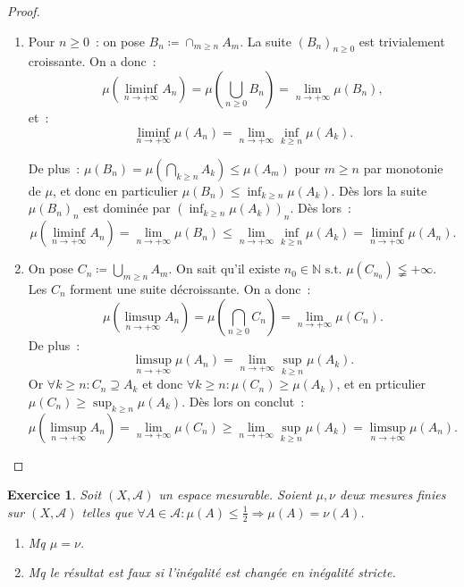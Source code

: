 \documentclass{article}
\newtheorem{ex}{Exercice}[section]
\newcommand{\pinfty}{{+\infty}}
\newcommand{\st}{\text{ s.t. }}
\newcommand{\N}{{\mathbb N}}
\begin{document}
\begin{proof}~
\begin{enumerate}
	\item Pour $n \geq 0$~: on pose $B_n \coloneqq \cap_{m \geq n}A_m$. La suite $(B_n)_{n \geq 0}$ est trivialement croissante. On a donc~:
	\[\mu\left(\liminf_{n \to \pinfty}A_n\right) = \mu\left(\bigcup_{n \geq 0}B_n\right) = \lim_{n \to \pinfty}\mu(B_n),\]
	et~:
	\[\liminf_{n \to \pinfty}\mu(A_n) = \lim_{n \to \pinfty}\inf_{k \geq n}\mu(A_k).\]

	De plus~: $\mu(B_n) = \mu\left(\bigcap_{k \geq n}A_k\right) \leq \mu(A_m)$ pour $m \geq n$ par monotonie de $\mu$, et donc en particulier $\mu(B_n) \leq \inf_{k \geq n}\mu(A_k)$.
	Dès lors la suite $\mu(B_n)_n$ est dominée par $(\inf_{k \geq n}\mu(A_k))_n$. Dès lors~:
	\[\mu\left(\liminf_{n \to \pinfty}A_n\right) = \lim_{n \to \pinfty}\mu(B_n) \leq \lim_{n \to \pinfty}\inf_{k \geq n}\mu(A_k) = \liminf_{n \to \pinfty}\mu(A_n).\]
	\item On pose $C_n \coloneqq \bigcup_{m \geq n}A_m$. On sait qu'il existe $n_0 \in \N \st \mu\left(C_{n_0}\right) \lneqq \pinfty$. Les $C_n$ forment une suite décroissante.
	On a donc~:
	\[\mu\left(\limsup_{n \to \pinfty}A_n\right) = \mu\left(\bigcap_{n \geq 0}C_n\right) = \lim_{n \to \pinfty}\mu(C_n).\]
	De plus~:
	\[\limsup_{n \to \pinfty}\mu(A_n) = \lim_{n \to \pinfty}\sup_{k \geq n}\mu(A_k).\]
	Or $\forall k \geq n : C_n \supseteq A_k$ et donc $\forall k \geq n : \mu(C_n) \geq \mu(A_k)$, et en prticulier $\mu(C_n) \geq \sup_{k \geq n}\mu(A_k)$. Dès lors on conclut~:
	\[\mu\left(\limsup_{n \to \pinfty}A_n\right) = \lim_{n \to \pinfty}\mu(C_n) \geq \lim_{n \to \pinfty}\sup_{k \geq n}\mu(A_k) = \limsup_{n \to \pinfty}\mu(A_n).\]
\end{enumerate}
\end{proof}

\begin{ex} Soit $(X, \mathcal A)$ un espace mesurable. Soient $\mu, \nu$ deux mesures finies sur $(X, \mathcal A)$ telles que
$\forall A \in \mathcal A : \mu(A) \leq \frac 12 \Rightarrow \mu(A) = \nu(A)$.
\begin{enumerate}
	\item Mq $\mu = \nu$.
	\item Mq le résultat est faux si l'inégalité est changée en inégalité stricte.
\end{enumerate}
\end{ex}
\end{document}
